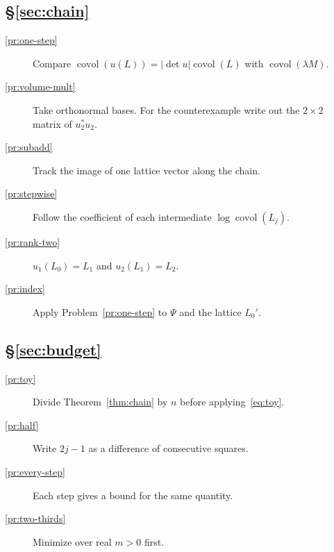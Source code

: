 \documentclass[reqno]{amsart}
\theoremstyle{definition}
\theoremstyle{plain}
\newcommand{\covol}{\operatorname{covol}}
\begin{document}
\subsection*{\S\ref{sec:chain}}
\begin{description}
\item[\ref{pr:one-step}] Compare \(\covol(u(L)) = \lvert \det u \rvert \covol(L)\) with \(\covol(\lambda M)\).
\item[\ref{pr:volume-mult}] Take orthonormal bases.  For the counterexample write out the \(2 \times 2\) matrix of \(u_2^* u_2\).
\item[\ref{pr:subadd}] Track the image of one lattice vector along the chain.
\item[\ref{pr:stepwise}] Follow the coefficient of each intermediate \(\log\covol(L_j)\).
\item[\ref{pr:rank-two}] \(u_1(L_0) = L_1\) and \(u_2(L_1) = L_2\).
\item[\ref{pr:index}] Apply Problem~\ref{pr:one-step} to \(\Psi\) and the lattice \(L_0'\).
\end{description}

\subsection*{\S\ref{sec:budget}}
\begin{description}
\item[\ref{pr:toy}] Divide Theorem~\ref{thm:chain} by \(n\) before applying~\eqref{eq:toy}.
\item[\ref{pr:half}] Write \(2j - 1\) as a difference of consecutive squares.
\item[\ref{pr:every-step}] Each step gives a bound for the same quantity.
\item[\ref{pr:two-thirds}] Minimize over real \(m > 0\) first.
\end{description}
\end{document}
